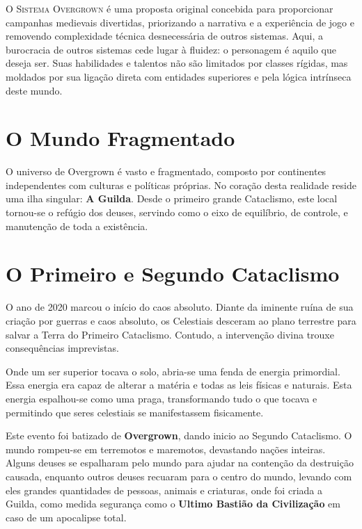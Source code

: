 
\lettrine[lines=3, lhang=0.1, findent=2pt]{\ringmfamily O}{ Sistema Overgrown} é uma proposta original concebida para proporcionar campanhas medievais divertidas, priorizando a narrativa e a experiência de jogo e removendo complexidade técnica desnecessária de outros sistemas. Aqui, a burocracia de outros sistemas cede lugar à fluidez: o personagem é aquilo que deseja ser. Suas habilidades e talentos não são limitados por classes rígidas, mas moldados por sua ligação direta com entidades superiores e pela lógica intrínseca deste mundo.

\section*{O Mundo Fragmentado}
O universo de Overgrown é vasto e fragmentado, composto por continentes independentes com culturas e políticas próprias. No coração desta realidade reside uma ilha singular: \textbf{A Guilda}. Desde o primeiro grande Cataclismo, este local tornou-se o refúgio dos deuses, servindo como o eixo de equilíbrio, de controle, e manutenção de toda a existência.

\section*{O Primeiro e Segundo Cataclismo}
O ano de 2020 marcou o início do caos absoluto. Diante da iminente ruína de sua criação por guerras e caos absoluto, os Celestiais desceram ao plano terrestre para salvar a Terra do Primeiro Cataclismo. Contudo, a intervenção divina trouxe consequências imprevistas. 

Onde um ser superior tocava o solo, abria-se uma fenda de energia primordial. Essa energia era capaz de alterar a matéria e todas as leis físicas e naturais. Esta energia espalhou-se como uma praga, transformando tudo o que tocava e permitindo que seres celestiais se manifestassem fisicamente. 

Este evento foi batizado de \textbf{Overgrown}, dando inicio ao Segundo Cataclismo. O mundo rompeu-se em terremotos e maremotos, devastando nações inteiras. Alguns deuses se espalharam pelo mundo para ajudar na contenção da destruição causada, enquanto outros deuses recuaram para o centro do mundo, levando com eles grandes quantidades de pessoas, animais e criaturas, onde foi criada a Guilda, como medida segurança como o \textbf{Ultimo Bastião da Civilização} em caso de um apocalipse total.


